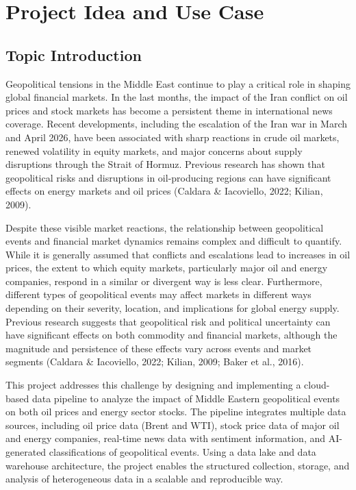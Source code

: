 \documentclass[11pt,a4paper]{article}
\begin{document}

\section{Project Idea and Use Case}
\label{sec:introduction}

\subsection{Topic Introduction}
\label{sec:topic_introduction}

Geopolitical tensions in the Middle East continue to play a critical role in shaping global financial markets. In the last months, the impact of the Iran conflict on oil prices and stock markets has become a persistent theme in international news coverage. Recent developments, including the escalation of the Iran war in March and April 2026, have been associated with sharp reactions in crude oil markets, renewed volatility in equity markets, and major concerns about supply disruptions through the Strait of Hormuz. Previous research has shown that geopolitical risks and disruptions in oil-producing regions can have significant effects on energy markets and oil prices (Caldara \& Iacoviello, 2022; Kilian, 2009).

Despite these visible market reactions, the relationship between geopolitical events and financial market dynamics remains complex and difficult to quantify. While it is generally assumed that conflicts and escalations lead to increases in oil prices, the extent to which equity markets, particularly major oil and energy companies, respond in a similar or divergent way is less clear. Furthermore, different types of geopolitical events may affect markets in different ways depending on their severity, location, and implications for global energy supply. Previous research suggests that geopolitical risk and political uncertainty can have significant effects on both commodity and financial markets, although the magnitude and persistence of these effects vary across events and market segments (Caldara \& Iacoviello, 2022; Kilian, 2009; Baker et al., 2016).

This project addresses this challenge by designing and implementing a cloud-based data pipeline to analyze the impact of Middle Eastern geopolitical events on both oil prices and energy sector stocks. The pipeline integrates multiple data sources, including oil price data (Brent and WTI), stock price data of major oil and energy companies, real-time news data with sentiment information, and AI-generated classifications of geopolitical events. Using a data lake and data warehouse architecture, the project enables the structured collection, storage, and analysis of heterogeneous data in a scalable and reproducible way.
\end{document}
